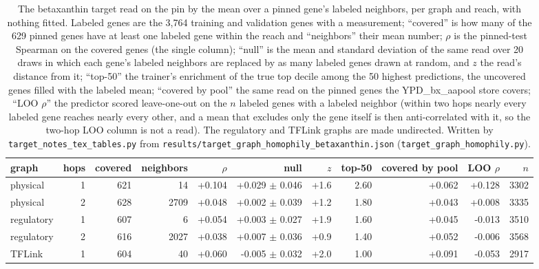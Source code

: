 \begin{table}[H]
  \centering
  \footnotesize
  \caption[Label propagation of betaxanthin on the graphs]{The betaxanthin target read on the pin by the mean over a pinned gene's labeled neighbors, per graph and reach, with nothing fitted. Labeled genes are the 3,764 training and validation genes with a measurement; ``covered'' is how many of the 629 pinned genes have at least one labeled gene within the reach and ``neighbors'' their mean number; $\rho$ is the pinned-test Spearman on the covered genes (the single column); ``null'' is the mean and standard deviation of the same read over 20 draws in which each gene's labeled neighbors are replaced by as many labeled genes drawn at random, and $z$ the read's distance from it; ``top-50'' the trainer's enrichment of the true top decile among the 50 highest predictions, the uncovered genes filled with the labeled mean; ``covered by pool'' the same read on the pinned genes the YPD\_bx\_aapool store covers; ``LOO $\rho$'' the predictor scored leave-one-out on the $n$ labeled genes with a labeled neighbor (within two hops nearly every labeled gene reaches nearly every other, and a mean that excludes only the gene itself is then anti-correlated with it, so the two-hop LOO column is not a read). The regulatory and TFLink graphs are made undirected. Written by \texttt{target\_notes\_tex\_tables.py} from \texttt{results/target\_graph\_homophily\_betaxanthin.json} (\texttt{target\_graph\_homophily.py}).}
  \label{tab:graph-homophily}
  \begin{tabular}{@{}lrrrrrrrrrr@{}}
    \hline
    graph & hops & covered & neighbors & $\rho$ & null & $z$ & top-50 & covered by pool & LOO $\rho$ & $n$ \\
    \hline
    physical & 1 & 621 & 14 & +0.104 & +0.029 $\pm$ 0.046 & +1.6 & 2.60 & +0.062 & +0.128 & 3302 \\
    physical & 2 & 628 & 2709 & +0.048 & +0.002 $\pm$ 0.039 & +1.2 & 1.80 & +0.043 & +0.008 & 3335 \\
    regulatory & 1 & 607 & 6 & +0.054 & +0.003 $\pm$ 0.027 & +1.9 & 1.60 & +0.045 & -0.013 & 3510 \\
    regulatory & 2 & 616 & 2027 & +0.038 & +0.007 $\pm$ 0.036 & +0.9 & 1.40 & +0.052 & -0.006 & 3568 \\
    TFLink & 1 & 604 & 40 & +0.060 & -0.005 $\pm$ 0.032 & +2.0 & 1.00 & +0.091 & -0.053 & 2917 \\

\end{tabular}
\end{table}

